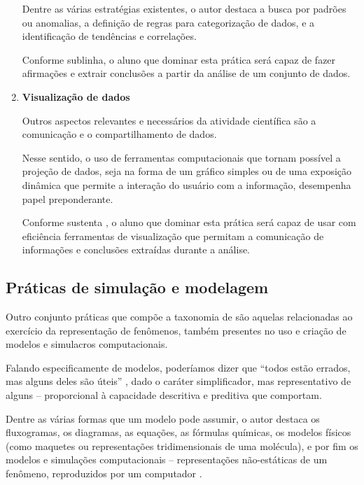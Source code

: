 \begin{enumerate}
  Dentre as várias estratégias existentes, o autor destaca a busca por padrões ou anomalias, a definição de regras para categorização de dados, e a identificação de tendências e correlações. 

  Conforme sublinha, o aluno que dominar esta prática será capaz de fazer afirmações e extrair conclusões a partir da análise de um conjunto de dados.


  \item \textbf{Visualização de dados}

  Outros aspectos relevantes e necessários da atividade científica são a comunicação e o compartilhamento de dados.

  Nesse sentido, o uso de ferramentas computacionais que tornam possível a projeção de dados, seja na forma de um gráfico simples ou de uma exposição dinâmica que permite a interação do usuário com a informação, desempenha papel preponderante.

  Conforme sustenta , o aluno que dominar esta prática será capaz de usar com eficiência ferramentas de visualização que permitam a comunicação de informações e conclusões extraídas durante a análise.

\end{enumerate}

\subsection{Práticas de simulação e modelagem}\label{sub-sec:praticas-de-simulacao-e-modelagem}

Outro conjunto práticas que compõe a taxonomia de  são aquelas relacionadas ao exercício da representação de fenômenos, também presentes no uso e criação de modelos e simulacros computacionais. 

Falando especificamente de modelos, poderíamos dizer que ``todos estão errados, mas alguns deles são úteis'' , dado o caráter simplificador, mas representativo de alguns -- proporcional à capacidade descritiva e preditiva que comportam. 

Dentre as várias formas que um modelo pode assumir, o autor destaca os fluxogramas, os diagramas, as equações, as fórmulas químicas, os modelos físicos (como maquetes ou representações tridimensionais de uma molécula), e por fim os modelos e simulações computacionais -- representações não-estáticas de um fenômeno, reproduzidos por um computador \cite{Weintrop2016}.

